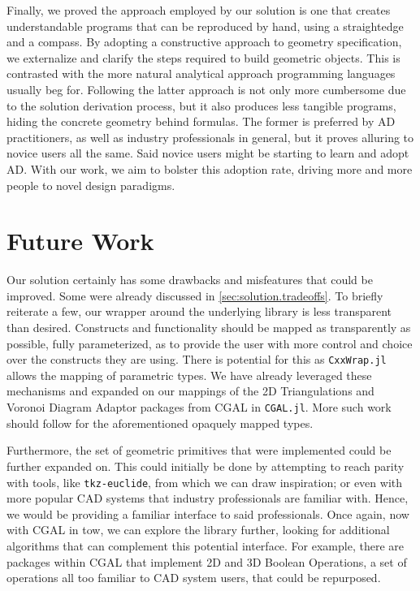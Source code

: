 Finally, we proved the approach employed by our solution is one that creates
understandable programs that can be reproduced by hand, using a straightedge and
a compass.  By adopting a constructive approach to geometry specification, we
externalize and clarify the steps required to build geometric objects.  This is
contrasted with the more natural analytical approach programming languages
usually beg for.  Following the latter approach is not only more cumbersome due
to the solution derivation process, but it also produces less tangible programs,
hiding the concrete geometry behind formulas.  The former is preferred by
\ac{AD} practitioners, as well as industry professionals in general, but it
proves alluring to novice users all the same.  Said novice users might be
starting to learn and adopt \ac{AD}.  With our work, we aim to bolster this
adoption rate, driving more and more people to novel design paradigms.

\section*{Future Work}

Our solution certainly has some drawbacks and misfeatures that could be
improved.  Some were already discussed in \cref{sec:solution.tradeoffs}.  To
briefly reiterate a few, our wrapper around the underlying library is less
transparent than desired.  Constructs and functionality should be mapped as
transparently as possible, fully parameterized, as to provide the user with more
control and choice over the constructs they are using.  There is potential for
this as \texttt{CxxWrap.jl} allows the mapping of parametric types.  We have
already leveraged these mechanisms and expanded on our mappings of the 2D
Triangulations and Voronoi Diagram Adaptor packages from \ac{CGAL} in
\texttt{CGAL.jl}.  More such work should follow for the aforementioned opaquely
mapped types.

Furthermore, the set of geometric primitives that were implemented could be
further expanded on.  This could initially be done by attempting to reach parity
with tools, like \texttt{tkz-euclide}, from which we can draw inspiration; or
even with more popular \ac{CAD} systems that industry professionals are familiar
with.  Hence, we would be providing a familiar interface to said professionals.
Once again, now with \ac{CGAL} in tow, we can explore the library further,
looking for additional algorithms that can complement this potential interface.
For example, there are packages within \ac{CGAL} that implement 2D and 3D
Boolean Operations, a set of operations all too familiar to \ac{CAD} system
users, that could be repurposed.

